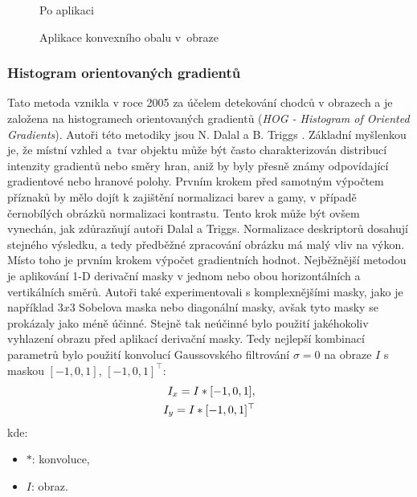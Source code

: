 \begin{figure}[H]
\begin{minipage}{.5\textwidth}
  \caption*{Po aplikaci}
  \label{fig:result}
\end{minipage}
\caption{Aplikace konvexního obalu v~obraze}
\label{fig:convexHull}
\end{figure}

\subsubsection{Histogram orientovaných gradientů}

Tato metoda vznikla v roce 2005 za účelem detekování chodců v obrazech a je založena na histogramech orientovaných gradientů (\textit{HOG - Histogram of Oriented Gradients}). Autoři této metodiky jsou N. Dalal a B. Triggs \cite{hog:dalal}. Základní myšlenkou je, že místní vzhled a~tvar objektu může být často charakterizován distribucí intenzity gradientů nebo směry hran, aniž by byly přesně známy odpovídající gradientové nebo hranové polohy.  
Prvním krokem před samotným výpočtem příznaků by mělo dojít k zajištění normalizaci barev a gamy, v případě černobílých obrázků normalizaci kontrastu. Tento krok může být ovšem vynechán, jak zdůrazňují autoři Dalal a Triggs. Normalizace deskriptorů dosahují stejného výsledku, a tedy předběžné zpracování obrázku má malý vliv na výkon. Místo toho je prvním krokem výpočet gradientních hodnot. Nejběžnější metodou je aplikování 1-D derivační masky v jednom nebo obou horizontálních a vertikálních směrů. Autoři také experimentovali s komplexnějšími masky, jako je například $3x3$ Sobelova maska nebo diagonální masky, avšak tyto masky se prokázaly jako méně účinné. Stejně tak neúčinné bylo použití jakéhokoliv vyhlazení obrazu před aplikací derivační masky. Tedy nejlepší kombinací parametrů bylo použití konvolucí Gaussovského filtrování $\sigma = 0$ na obraze $I$ s maskou $[-1, 0, 1]$, $[-1,0,1]^\top$:
\begin{equation}
\centering
 \label{eq:hogMask}
 \begin{aligned}
I_x = I * [-1, 0, 1], \\
I_y = I * [-1, 0, 1]^\top
 \end{aligned}
\end{equation}
kde:
\begin{itemize}[label=]
  \item $*$: konvoluce,
  \item $I$: obraz.
\end{itemize}

